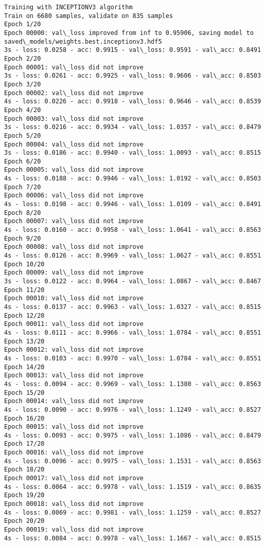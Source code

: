 \documentclass[11pt]{article}
\begin{document}
\begin{Verbatim}[commandchars=\\\{\}]
Training with INCEPTIONV3 algorithm
Train on 6680 samples, validate on 835 samples
Epoch 1/20
Epoch 00000: val\_loss improved from inf to 0.95906, saving model to saved\_models/weights.best.inceptionv3.hdf5
3s - loss: 0.0258 - acc: 0.9915 - val\_loss: 0.9591 - val\_acc: 0.8491
Epoch 2/20
Epoch 00001: val\_loss did not improve
3s - loss: 0.0261 - acc: 0.9925 - val\_loss: 0.9606 - val\_acc: 0.8503
Epoch 3/20
Epoch 00002: val\_loss did not improve
4s - loss: 0.0226 - acc: 0.9918 - val\_loss: 0.9646 - val\_acc: 0.8539
Epoch 4/20
Epoch 00003: val\_loss did not improve
3s - loss: 0.0216 - acc: 0.9934 - val\_loss: 1.0357 - val\_acc: 0.8479
Epoch 5/20
Epoch 00004: val\_loss did not improve
3s - loss: 0.0186 - acc: 0.9940 - val\_loss: 1.0093 - val\_acc: 0.8515
Epoch 6/20
Epoch 00005: val\_loss did not improve
4s - loss: 0.0188 - acc: 0.9946 - val\_loss: 1.0192 - val\_acc: 0.8503
Epoch 7/20
Epoch 00006: val\_loss did not improve
4s - loss: 0.0198 - acc: 0.9946 - val\_loss: 1.0109 - val\_acc: 0.8491
Epoch 8/20
Epoch 00007: val\_loss did not improve
4s - loss: 0.0160 - acc: 0.9958 - val\_loss: 1.0641 - val\_acc: 0.8563
Epoch 9/20
Epoch 00008: val\_loss did not improve
4s - loss: 0.0126 - acc: 0.9969 - val\_loss: 1.0627 - val\_acc: 0.8551
Epoch 10/20
Epoch 00009: val\_loss did not improve
3s - loss: 0.0122 - acc: 0.9964 - val\_loss: 1.0867 - val\_acc: 0.8467
Epoch 11/20
Epoch 00010: val\_loss did not improve
4s - loss: 0.0137 - acc: 0.9963 - val\_loss: 1.0327 - val\_acc: 0.8515
Epoch 12/20
Epoch 00011: val\_loss did not improve
4s - loss: 0.0111 - acc: 0.9966 - val\_loss: 1.0784 - val\_acc: 0.8551
Epoch 13/20
Epoch 00012: val\_loss did not improve
4s - loss: 0.0103 - acc: 0.9970 - val\_loss: 1.0784 - val\_acc: 0.8551
Epoch 14/20
Epoch 00013: val\_loss did not improve
4s - loss: 0.0094 - acc: 0.9969 - val\_loss: 1.1380 - val\_acc: 0.8563
Epoch 15/20
Epoch 00014: val\_loss did not improve
4s - loss: 0.0090 - acc: 0.9976 - val\_loss: 1.1249 - val\_acc: 0.8527
Epoch 16/20
Epoch 00015: val\_loss did not improve
4s - loss: 0.0093 - acc: 0.9975 - val\_loss: 1.1086 - val\_acc: 0.8479
Epoch 17/20
Epoch 00016: val\_loss did not improve
4s - loss: 0.0096 - acc: 0.9975 - val\_loss: 1.1531 - val\_acc: 0.8563
Epoch 18/20
Epoch 00017: val\_loss did not improve
4s - loss: 0.0064 - acc: 0.9978 - val\_loss: 1.1519 - val\_acc: 0.8635
Epoch 19/20
Epoch 00018: val\_loss did not improve
4s - loss: 0.0069 - acc: 0.9981 - val\_loss: 1.1259 - val\_acc: 0.8527
Epoch 20/20
Epoch 00019: val\_loss did not improve
4s - loss: 0.0084 - acc: 0.9978 - val\_loss: 1.1667 - val\_acc: 0.8515

    \end{Verbatim}
\end{document}

